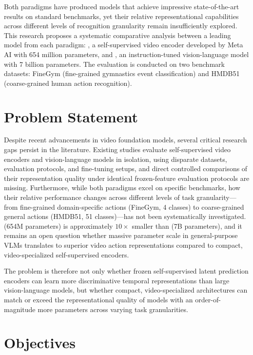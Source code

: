 Both paradigms have produced models that achieve impressive state-of-the-art results on standard benchmarks, yet their relative representational capabilities across different levels of recognition granularity remain insufficiently explored. This research proposes a systematic comparative analysis between a leading model from each paradigm: \vjepaa{} \citep{assran2025vjepa2}, a self-supervised video encoder developed by Meta AI with 654 million parameters, and \qwenvl{} \citep{qwen2025qwen3vl}, an instruction-tuned vision-language model with 7 billion parameters. The evaluation is conducted on two benchmark datasets: FineGym (fine-grained gymnastics event classification) and HMDB51 (coarse-grained human action recognition).

\section{Problem Statement}

Despite recent advancements in video foundation models, several critical research gaps persist in the literature. Existing studies evaluate self-supervised video encoders and vision-language models in isolation, using disparate datasets, evaluation protocols, and fine-tuning setups, and direct controlled comparisons of their representation quality under identical frozen-feature evaluation protocols are missing. Furthermore, while both paradigms excel on specific benchmarks, how their relative performance changes across different levels of task granularity---from fine-grained domain-specific actions (FineGym, 4 classes) to coarse-grained general actions (HMDB51, 51 classes)---has not been systematically investigated. \vjepaa{} (654M parameters) is approximately $10\times$ smaller than \qwenvl{} (7B parameters), and it remains an open question whether massive parameter scale in general-purpose VLMs translates to superior video action representations compared to compact, video-specialized self-supervised encoders.

The problem is therefore not only whether frozen self-supervised latent prediction encoders can learn more discriminative temporal representations than large vision-language models, but whether compact, video-specialized architectures can match or exceed the representational quality of models with an order-of-magnitude more parameters across varying task granularities.

\section{Objectives}

